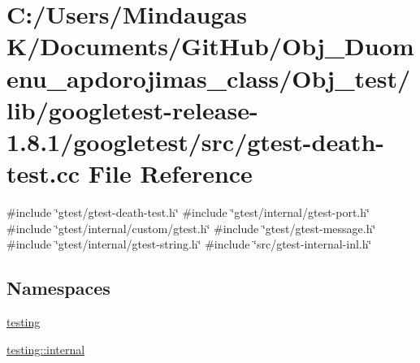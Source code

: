 \hypertarget{_obj__test_2lib_2googletest-release-1_88_81_2googletest_2src_2gtest-death-test_8cc}{}\section{C\+:/\+Users/\+Mindaugas K/\+Documents/\+Git\+Hub/\+Obj\+\_\+\+Duomenu\+\_\+apdorojimas\+\_\+class/\+Obj\+\_\+test/lib/googletest-\/release-\/1.8.1/googletest/src/gtest-\/death-\/test.cc File Reference}
\label{_obj__test_2lib_2googletest-release-1_88_81_2googletest_2src_2gtest-death-test_8cc}
{\ttfamily \#include \char`\"{}gtest/gtest-\/death-\/test.\+h\char`\"{}}\newline
{\ttfamily \#include \char`\"{}gtest/internal/gtest-\/port.\+h\char`\"{}}\newline
{\ttfamily \#include \char`\"{}gtest/internal/custom/gtest.\+h\char`\"{}}\newline
{\ttfamily \#include \char`\"{}gtest/gtest-\/message.\+h\char`\"{}}\newline
{\ttfamily \#include \char`\"{}gtest/internal/gtest-\/string.\+h\char`\"{}}\newline
{\ttfamily \#include \char`\"{}src/gtest-\/internal-\/inl.\+h\char`\"{}}\newline
\subsection*{Namespaces}
\begin{DoxyCompactItemize}
\item 
 \mbox{\hyperlink{namespacetesting}{testing}}
\item 
 \mbox{\hyperlink{namespacetesting_1_1internal}{testing\+::internal}}
\end{DoxyCompactItemize}
